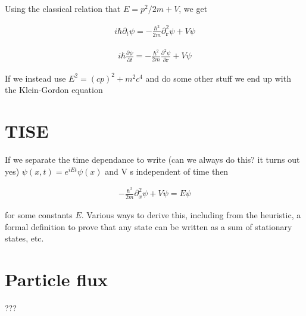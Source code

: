 \documentclass{article}
\begin{document}
Using the classical relation that $E = p^2/2m + V$, we get

\begin{align}
i \hbar \partial_t{\psi} = -\frac{\hbar^2}{2m} \partial^2_\mathbf{r}{\psi} + V\psi
\end{align}

\begin{align}
i \hbar \frac{\partial{\psi}}{{\partial t}} = -\frac{\hbar^2}{2m} \frac{\partial^2 \psi}{\partial \mathbf{r}} + V\psi
\end{align}

If we instead use $E^2 = (cp)^2 + m^2c^4$ and do some other stuff we end up with the Klein-Gordon equation

\section{TISE}

If we separate the time dependance to write (can we always do this? it turns out yes) $\psi(x,t) = e^{iEt}\psi(x)$ and V s independent of time then

\begin{align}
-\frac{\hbar^2}{2m} \partial^2_x{\psi} + V\psi = E\psi
\end{align}

for some constants $E$. Various ways to derive this, including from the heuristic, a formal definition to prove that any state can be written as a sum of stationary states, etc.

\section{Particle flux}
???
\end{document}
